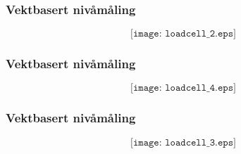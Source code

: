 \documentclass[aspectratio=169,xcolor=dvipsnames]{beamer}
\begin{document}
%
%
\begin{frame}
	\frametitle{Vektbasert nivåmåling}

$$\texttt{[image: loadcell\_2.eps]}$$
\end{frame}
%
%
%
\begin{frame}
	\frametitle{Vektbasert nivåmåling}

$$\texttt{[image: loadcell\_4.eps]}$$
\end{frame}
%
%
%
%
%
%
\begin{frame}
	\frametitle{Vektbasert nivåmåling}

$$\texttt{[image: loadcell\_3.eps]}$$
\end{frame}
%
\end{document}
